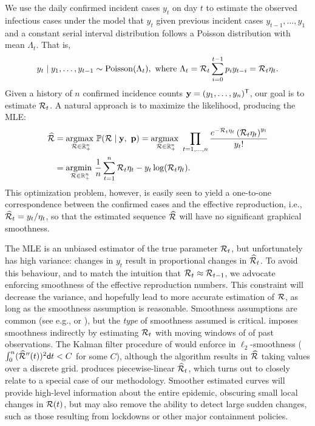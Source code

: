 We use the daily confirmed incident cases $y_t$ on day $t$ to estimate the
observed infectious cases under the model that $y_t$ given previous incident
cases $y_{t-1},\ldots,y_1$ and a constant serial interval distribution follows a
Poisson distribution with mean $\Lambda_t$. That is, 
$$
y_t \mid y_1,\ldots,y_{t-1} \sim \mathrm{Poisson}(\Lambda_t), \textrm{ where } \Lambda_t =  \mathcal{R}_t\sum_{i=0}^{t-1}p_i y_{t-i} = \mathcal{R}_t\eta_t.$$ 
Given a history of $n$ confirmed incidence counts $\mathbf{y} = (y_1,\ldots,y_n)^{\mathsf{T}}$,
our goal is to estimate $\mathcal{R}_t$. A natural approach is to maximize the
likelihood, producing the MLE:
\begin{equation} \label{eq:mle}
  \begin{split}
    \widehat{\mathcal{R}} &= \underset{\mathcal{R} \in \mathbb{R}_+^n}{\operatorname*{argmax}\ } \mathbb{P}(\mathcal{R} \mid \mathbf{y},\ \mathbf{p})
    = \underset{\mathcal{R} \in \mathbb{R}^n_+}{\operatorname*{argmax}\ } \prod_{t = 1,\dots,n} 
    \frac{e^{- \mathcal{R}_t \eta_t} \left(\mathcal{R}_t \eta_t\right)^{y_t} }{y_t!}\\
    &= \underset{\mathcal{R}\in\mathbb{R}^n_+}{\operatorname*{argmin}\ } \frac{1}{n}\sum_{t = 1}^n \mathcal{R}_t\eta_t - y_t\log(\mathcal{R}_t\eta_t).
  \end{split}
\end{equation}
This optimization problem, however, is easily seen to yield a one-to-one
correspondence between the confirmed cases and the effective reproduction, i.e.,
$\widehat{\mathcal{R}}_t = y_t / \eta_t$, so that the estimated sequence
$\widehat{\mathcal{R}}$ will have no significant graphical smoothness.

The MLE is an unbiased estimator of the true parameter $\mathcal{R}_t$, but
unfortunately has high variance: changes in $y_t$ result in proportional changes
in $\widehat{\mathcal{R}}_t$. To avoid this behaviour, and to match the intuition that
$\mathcal{R}_t \approx \mathcal{R}_{t-1}$, we advocate enforcing smoothness of the effective
reproduction numbers. This constraint will decrease the variance, and hopefully
lead to more accurate estimation of $\mathcal{R}$, as long as the smoothness
assumption is reasonable. Smoothness assumptions are common (see e.g.,
\citet{parag2021improved} or \citet{gostic2020practical}), but the \emph{type}
of smoothness assumed is critical. \citet{cori2020package} imposes smoothness
indirectly by estimating $\mathcal{R}_t$ with moving windows of of past observations.
The Kalman filter procedure of \citet{parag2021improved} would enforce in
$\ell_2$-smoothness ($\int_0^n (\widehat{\mathcal{R}}''(t))^{2}\mathsf{d} t < C$ for some
$C$), although the algorithm results in $\widehat{\mathcal{R}}$ taking values over a
discrete grid. \citet{pascal2022nonsmooth} produces piecewise-linear
$\widehat{\mathcal{R}}_t$, which turns out to closely relate to a special case of our
methodology.
Smoother estimated curves will provide high-level information about the entire
epidemic, obscuring small local changes in $\mathcal{R}(t)$, but may also remove the
ability to detect large sudden changes, such as those resulting from lockdowns
or other major containment policies. 

